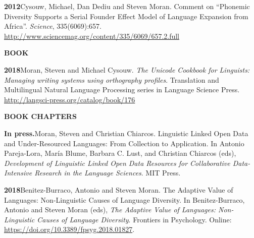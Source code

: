 \documentclass[11pt]{article}
\newcommand{\hangpara}{
 \setlength{\parindent}{0in} %
 \hangindent=0.42in %
}
\begin{document}
\vskip 6pt
\hangpara
{\bf 2012}\hspace{1ex}Cysouw, Michael, Dan Dediu and Steven Moran. Comment on ``Phonemic Diversity Supports a Serial Founder Effect Model of Language Expansion from Africa''. \textit{Science}, 335(6069):657. \url{http://www.sciencemag.org/content/335/6069/657.2.full}

\vskip 20pt
\begin{flushleft}
{\bf BOOK}
\end{flushleft}

\hangpara
{\bf 2018}\hspace{1ex}Moran, Steven and Michael Cysouw. {\it The Unicode Cookbook for Linguists: Managing writing systems using orthography profiles}. Translation and Multilingual Natural Language Processing series in Language Science Press. \url{http://langsci-press.org/catalog/book/176}


\vskip 20pt
\begin{flushleft}
{\bf BOOK CHAPTERS}
\end{flushleft}

\begin{comment}
\hangpara{\bf Invited.}\hspace{1ex}Moran, Steven. Managing data in the development of PHOIBLE: the Phonetics Information Base and Lexicon (PHOIBLE) database. In Andrea L. Berez-Kroeker, Bradley McDonnell, & Eve Koller (eds), \textit{The Open Handbook of Linguistic Data Management: Open Handbooks in Linguistics}. MIT Press.
\end{comment}

\hangpara{\bf In press.}\hspace{1ex}Moran, Steven and Christian Chiarcos. Linguistic Linked Open Data and Under-Resourced Languages: From Collection to Application. In Antonio Pareja-Lora, María Blume, Barbara C. Lust, and Christian Chiarcos (eds), \textit{Development of Linguistic Linked Open Data Resources for Collaborative Data-Intensive Research in the Language Sciences}. MIT Press.

\vskip 6pt
\hangpara{\bf 2018}\hspace{1ex}Benitez-Burraco, Antonio and Steven Moran. The Adaptive Value of Languages: Non-Linguistic Causes of Language Diversity. In Benitez-Burraco, Antonio and Steven Moran (eds), \textit{The Adaptive Value of Languages: Non-Linguistic Causes of Language Diversity}. Frontiers in Psychology. Online: \url{https://doi.org/10.3389/fpsyg.2018.01827}.
\end{document}
